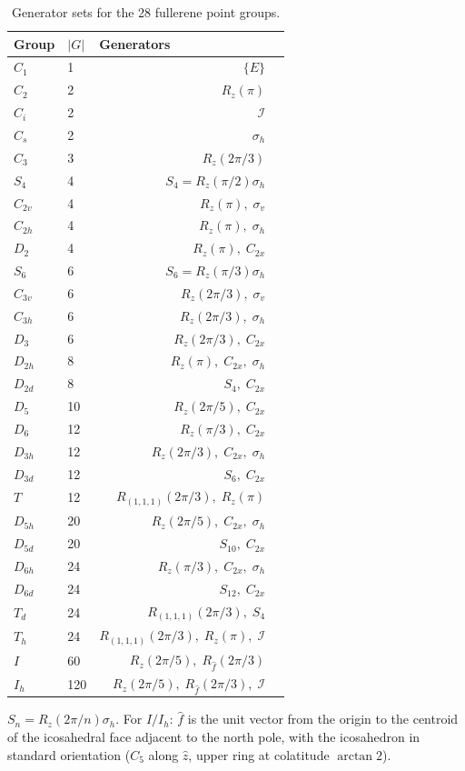 \documentclass[11pt]{article}
\begin{document}
\begin{table}[ht]
\centering
\caption{Generator sets for the 28 fullerene point groups.}
\label{tab:generators}
\small
\begin{tabular}{@{}llrl@{}}
\toprule
Group & $|G|$ & \multicolumn{2}{l}{Generators} \\
\midrule
$C_1$  &  1 & $\{E\}$ \\
$C_2$  &  2 & $R_z(\pi)$ \\
$C_i$  &  2 & $\mathcal{I}$ \\
$C_s$  &  2 & $\sigma_h$ \\
$C_3$  &  3 & $R_z(2\pi/3)$ \\
$S_4$  &  4 & $S_4 = R_z(\pi/2)\sigma_h$ \\
$C_{2v}$ & 4 & $R_z(\pi),\; \sigma_v$ \\
$C_{2h}$ & 4 & $R_z(\pi),\; \sigma_h$ \\
$D_2$  &  4 & $R_z(\pi),\; C_{2x}$ \\
$S_6$  &  6 & $S_6 = R_z(\pi/3)\sigma_h$ \\
$C_{3v}$ & 6 & $R_z(2\pi/3),\; \sigma_v$ \\
$C_{3h}$ & 6 & $R_z(2\pi/3),\; \sigma_h$ \\
$D_3$  &  6 & $R_z(2\pi/3),\; C_{2x}$ \\
$D_{2h}$ & 8 & $R_z(\pi),\; C_{2x},\; \sigma_h$ \\
$D_{2d}$ & 8 & $S_4,\; C_{2x}$ \\
$D_5$  & 10 & $R_z(2\pi/5),\; C_{2x}$ \\
$D_6$  & 12 & $R_z(\pi/3),\; C_{2x}$ \\
$D_{3h}$ & 12 & $R_z(2\pi/3),\; C_{2x},\; \sigma_h$ \\
$D_{3d}$ & 12 & $S_6,\; C_{2x}$ \\
$T$    & 12 & $R_{(1,1,1)}(2\pi/3),\; R_z(\pi)$ \\
$D_{5h}$ & 20 & $R_z(2\pi/5),\; C_{2x},\; \sigma_h$ \\
$D_{5d}$ & 20 & $S_{10},\; C_{2x}$ \\
$D_{6h}$ & 24 & $R_z(\pi/3),\; C_{2x},\; \sigma_h$ \\
$D_{6d}$ & 24 & $S_{12},\; C_{2x}$ \\
$T_d$  & 24 & $R_{(1,1,1)}(2\pi/3),\; S_4$ \\
$T_h$  & 24 & $R_{(1,1,1)}(2\pi/3),\; R_z(\pi),\; \mathcal{I}$ \\
$I$    & 60 & $R_z(2\pi/5),\; R_{\hat{f}}(2\pi/3)$ \\
$I_h$  & 120 & $R_z(2\pi/5),\; R_{\hat{f}}(2\pi/3),\; \mathcal{I}$ \\
\bottomrule
\end{tabular}

\medskip
\raggedright
\footnotesize
$S_n = R_z(2\pi/n)\sigma_h$. For $I/I_h$: $\hat{f}$ is the unit
vector from the origin to the centroid of the icosahedral face adjacent
to the north pole, with the icosahedron in standard orientation ($C_5$
along $\hat{z}$, upper ring at colatitude $\arctan 2$).
\end{table}
\end{document}
